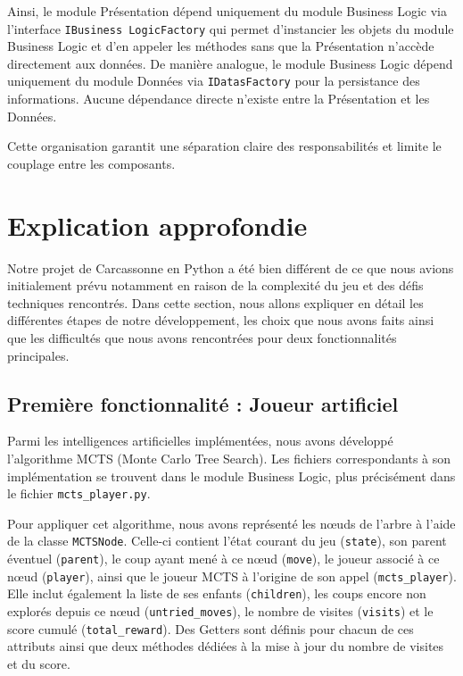 \documentclass[11pt]{article}
\begin{document}
Ainsi, le module Présentation dépend uniquement du module Business 
Logic via l'interface \texttt{IBusiness \allowbreak LogicFactory} qui permet 
d'instancier les objets du module Business Logic et d'en appeler 
les méthodes sans que la Présentation n'accède directement aux 
données. De manière analogue, le module Business Logic dépend 
uniquement du module Données via \texttt{IDatasFactory} pour la 
persistance des informations. Aucune dépendance directe n'existe 
entre la Présentation et les Données.

Cette organisation garantit une séparation claire des responsabilités 
et limite le couplage entre les composants.





\section{Explication approfondie}

Notre projet de Carcassonne en Python a été bien différent de ce que nous avions initialement prévu notamment en raison de la complexité du jeu et des défis techniques rencontrés.
Dans cette section, nous allons expliquer en détail les différentes étapes de notre développement, les choix que nous avons faits ainsi que les difficultés que nous avons rencontrées pour deux fonctionnalités principales.


\subsection{Première fonctionnalité : Joueur artificiel}

Parmi les intelligences artificielles implémentées, nous avons développé l'algorithme MCTS (Monte Carlo Tree Search). Les fichiers correspondants à son implémentation se trouvent dans le module Business Logic, plus précisément dans le fichier \texttt{mcts\_player.py}.

Pour appliquer cet algorithme, nous avons représenté les nœuds de l'arbre à l'aide de la classe \texttt{MCTSNode}. Celle-ci contient l'état courant du jeu (\texttt{state}), son parent éventuel (\texttt{parent}), le coup ayant mené à ce nœud (\texttt{move}), le joueur associé à ce nœud (\texttt{player}), ainsi que le joueur MCTS à l'origine de son appel (\texttt{mcts\_player}). Elle inclut également la liste de ses enfants (\texttt{children}), les coups encore non explorés depuis ce nœud (\texttt{untried\_moves}), le nombre de visites (\texttt{visits}) et le score cumulé (\texttt{total\_reward}). Des Getters sont définis pour chacun de ces attributs ainsi que deux méthodes dédiées à la mise à jour du nombre de visites et du score.
\end{document}
